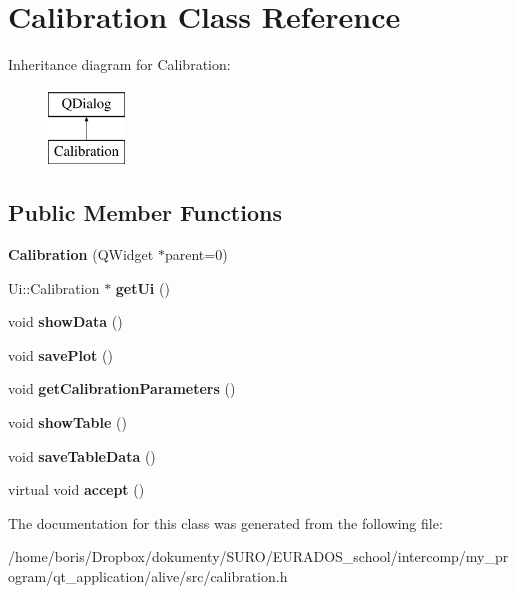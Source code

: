 \hypertarget{classCalibration}{\section{Calibration Class Reference}
\label{classCalibration}
}
Inheritance diagram for Calibration\-:\begin{figure}[H]
\begin{center}
\leavevmode
\includegraphics[height=2.000000cm]{classCalibration}
\end{center}
\end{figure}
\subsection*{Public Member Functions}
\begin{DoxyCompactItemize}
\item 
\hypertarget{classCalibration_a51dcbcaf05e8e841b0bcfb5511ba110c}{{\bfseries Calibration} (Q\-Widget $\ast$parent=0)}\label{classCalibration_a51dcbcaf05e8e841b0bcfb5511ba110c}

\item 
\hypertarget{classCalibration_a0c93ce32958eff964813d42ca517d730}{Ui\-::\-Calibration $\ast$ {\bfseries get\-Ui} ()}\label{classCalibration_a0c93ce32958eff964813d42ca517d730}

\item 
\hypertarget{classCalibration_a4d09685e8f5907b1be26edb8a5b0e060}{void {\bfseries show\-Data} ()}\label{classCalibration_a4d09685e8f5907b1be26edb8a5b0e060}

\item 
\hypertarget{classCalibration_ad5e1a103a408014eb62660e094443c54}{void {\bfseries save\-Plot} ()}\label{classCalibration_ad5e1a103a408014eb62660e094443c54}

\item 
\hypertarget{classCalibration_aeec90f8d9c81bf0ad91b35cc5db97331}{void {\bfseries get\-Calibration\-Parameters} ()}\label{classCalibration_aeec90f8d9c81bf0ad91b35cc5db97331}

\item 
\hypertarget{classCalibration_aa06e12a1921fa9b4f438a27a089d4436}{void {\bfseries show\-Table} ()}\label{classCalibration_aa06e12a1921fa9b4f438a27a089d4436}

\item 
\hypertarget{classCalibration_aecec6497e20fdd6236fefa3c39b53022}{void {\bfseries save\-Table\-Data} ()}\label{classCalibration_aecec6497e20fdd6236fefa3c39b53022}

\item 
\hypertarget{classCalibration_abfb479b712c0dc20a41f295d4353e8de}{virtual void {\bfseries accept} ()}\label{classCalibration_abfb479b712c0dc20a41f295d4353e8de}

\end{DoxyCompactItemize}


The documentation for this class was generated from the following file\-:\begin{DoxyCompactItemize}
\item 
/home/boris/\-Dropbox/dokumenty/\-S\-U\-R\-O/\-E\-U\-R\-A\-D\-O\-S\-\_\-school/intercomp/my\-\_\-program/qt\-\_\-application/alive/src/calibration.\-h\end{DoxyCompactItemize}
